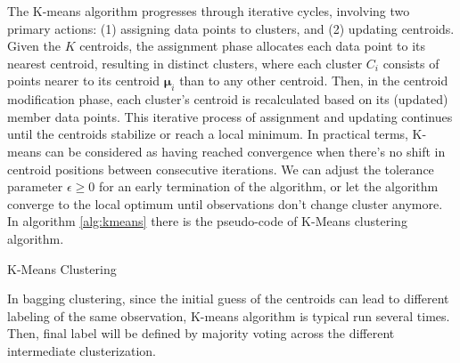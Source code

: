 The K-means algorithm progresses through iterative cycles, involving two primary actions: (1) assigning data points to clusters, and (2) updating centroids. Given the $K$ centroids, the assignment phase allocates each data point to its nearest centroid, resulting in distinct clusters, where each cluster $C_i$ consists of points nearer to its centroid $\bm{\mu}_i$ than to any other centroid. Then, in the centroid modification phase, each cluster's centroid is recalculated based on its (updated) member data points. This iterative process of assignment and updating continues until the centroids stabilize or reach a local minimum. In practical terms, K-means can be considered as having reached convergence when there's no shift in centroid positions between consecutive iterations. We can adjust the tolerance parameter $\epsilon \geq 0$ for an early termination of the algorithm, or let the algorithm converge to the local optimum until observations don't change cluster anymore. In algorithm \ref{alg:kmeans} there is the pseudo-code of K-Means clustering algorithm.
\begin{algorithm}[H]
\small
    \caption{K-Means Clustering}
    \label{alg:kmeans}
    \begin{algorithmic}[1]
    \REPEAT
    \ENDFOR
    \ENDFOR
    \end{algorithmic}
\end{algorithm} 
In bagging clustering, since the initial guess of the centroids can lead to different labeling of the same observation, K-means algorithm is typical run several times. Then, final label will be defined by majority voting across the different intermediate clusterization.


